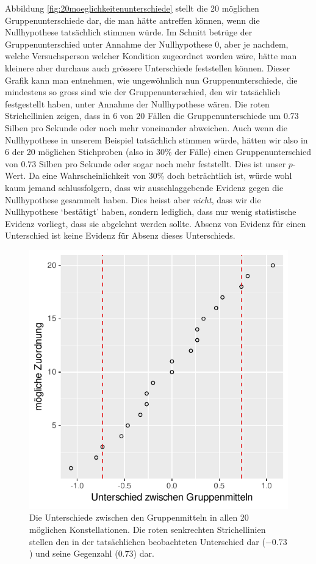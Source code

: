 \documentclass[oneside, 10pt]{book}\usepackage[]{graphicx}\usepackage[]{xcolor}
\newenvironment{knitrout}{}{} %
\begin{document}
Abbildung \ref{fig:20moeglichkeitenunterschiede}
stellt die 20 möglichen Gruppenunterschiede dar,
die man hätte antreffen können, wenn die Nullhypothese
tatsächlich stimmen würde. Im Schnitt betrüge
der Gruppenunterschied unter Annahme der Nullhypothese
0, aber je nachdem, welche Versuchsperson welcher Kondition
zugeordnet worden wäre, hätte man kleinere
aber durchaus auch grössere Unterschiede feststellen können.
Dieser Grafik kann man entnehmen, wie ungewöhnlich nun Gruppenunterschiede,
die mindestens so gross sind wie der Gruppenunterschied,
den wir tatsächlich festgestellt haben, unter Annahme der Nullhypothese wären.
Die roten Strichellinien zeigen, dass in 6 von 20 Fällen die
Gruppenunterschiede um 0.73 Silben pro Sekunde oder noch mehr voneinander abweichen.
Auch wenn die Nullhypothese in unserem Beispiel tatsächlich stimmen würde,
hätten wir also in 6 der 20 möglichen Stichproben (also in 30\% der Fälle)
einen Gruppenunterschied von 0.73 Silben pro Sekunde oder sogar noch
mehr feststellt. Dies ist unser $p$-Wert. Da eine Wahrscheinlichkeit
von 30\% doch beträchtlich ist, würde wohl kaum jemand schlussfolgern,
dass wir ausschlaggebende Evidenz gegen die Nullhypothese gesammelt haben.
Dies heisst aber \emph{nicht}, dass wir die Nullhypothese
`bestätigt' haben, sondern lediglich, dass nur wenig statistische Evidenz
vorliegt, dass sie abgelehnt werden sollte. Absenz von Evidenz für einen Unterschied
ist keine Evidenz für Absenz dieses Unterschieds.

\begin{knitrout}
\color{fgcolor}\begin{figure}[tp]

{\centering \includegraphics[width=.5\textwidth]{figs/unnamed-chunk-348-1} 

}

\caption{Die Unterschiede zwischen den Gruppenmitteln in allen 20 möglichen Konstellationen. Die roten senkrechten Strichellinien stellen den in der tatsächlichen beobachteten Unterschied dar ($-0.73$) und seine Gegenzahl ($0.73$) dar.\label{fig:20moeglichkeitenunterschiede}}\label{fig:unnamed-chunk-348}
\end{figure}

\end{knitrout}
\end{document}
